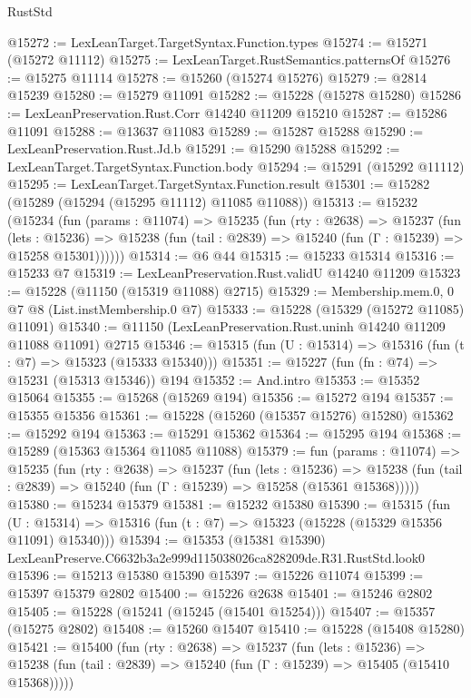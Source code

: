 \begin{lexlean}{RustStd}
\begin{coremodule}
@15272 := LexLeanTarget.TargetSyntax.Function.types
@15274 := @15271 (@15272 @11112)
@15275 := LexLeanTarget.RustSemantics.patternsOf
@15276 := @15275 @11114
@15278 := @15260 (@15274 @15276)
@15279 := @2814 @15239
@15280 := @15279 @11091
@15282 := @15228 (@15278 @15280)
@15286 := LexLeanPreservation.Rust.Corr @14240 @11209 @15210
@15287 := @15286 @11091
@15288 := @13637 @11083
@15289 := @15287 @15288
@15290 := LexLeanPreservation.Rust.Jd.b
@15291 := @15290 @15288
@15292 := LexLeanTarget.TargetSyntax.Function.body
@15294 := @15291 (@15292 @11112)
@15295 := LexLeanTarget.TargetSyntax.Function.result
@15301 := @15282 (@15289 (@15294 (@15295 @11112) @11085 @11088))
@15313 := @15232
    (@15234
      (fun (params : @11074) =>
      @15235
        (fun (rty : @2638) =>
        @15237
          (fun (lets : @15236) =>
          @15238 (fun (tail : @2839) => @15240 (fun (Γ : @15239) => @15258 @15301))))))
@15314 := @6 @44
@15315 := @15233 @15314
@15316 := @15233 @7
@15319 := LexLeanPreservation.Rust.validU @14240 @11209
@15323 := @15228 (@11150 (@15319 @11088) @2715)
@15329 := Membership.mem.{0, 0} @7 @8 (List.instMembership.{0} @7)
@15333 := @15228 (@15329 (@15272 @11085) @11091)
@15340 := @11150 (LexLeanPreservation.Rust.uninh @14240 @11209 @11088 @11091) @2715
@15346 := @15315 (fun (U : @15314) => @15316 (fun (t : @7) => @15323 (@15333 @15340)))
@15351 := @15227 (fun (fn : @74) => @15231 (@15313 @15346)) @194
@15352 := And.intro
@15353 := @15352 @15064
@15355 := @15268 (@15269 @194)
@15356 := @15272 @194
@15357 := @15355 @15356
@15361 := @15228 (@15260 (@15357 @15276) @15280)
@15362 := @15292 @194
@15363 := @15291 @15362
@15364 := @15295 @194
@15368 := @15289 (@15363 @15364 @11085 @11088)
@15379 := fun (params : @11074) =>
  @15235
    (fun (rty : @2638) =>
    @15237
      (fun (lets : @15236) =>
      @15238 (fun (tail : @2839) => @15240 (fun (Γ : @15239) => @15258 (@15361 @15368)))))
@15380 := @15234 @15379
@15381 := @15232 @15380
@15390 := @15315
    (fun (U : @15314) => @15316 (fun (t : @7) => @15323 (@15228 (@15329 @15356 @11091) @15340)))
@15394 := @15353 (@15381 @15390) LexLeanPreserve.C6632b3a2e999d115038026ca828209de.R31.RustStd.look0
@15396 := @15213 @15380 @15390
@15397 := @15226 @11074
@15399 := @15397 @15379 @2802
@15400 := @15226 @2638
@15401 := @15246 @2802
@15405 := @15228 (@15241 (@15245 (@15401 @15254)))
@15407 := @15357 (@15275 @2802)
@15408 := @15260 @15407
@15410 := @15228 (@15408 @15280)
@15421 := @15400
    (fun (rty : @2638) =>
    @15237
      (fun (lets : @15236) =>
      @15238 (fun (tail : @2839) => @15240 (fun (Γ : @15239) => @15405 (@15410 @15368)))))

\end{coremodule}
\end{lexlean}
